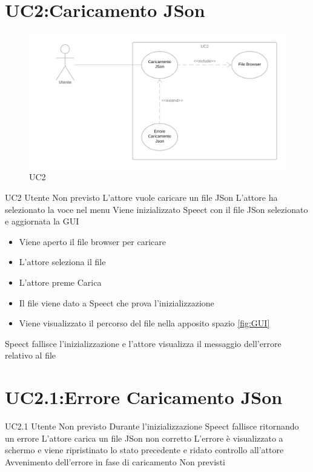 \documentclass[../AnalisideiRequisiti.tex]{subfiles}
\begin{document}
	\section{UC2:Caricamento JSon}
	\begin{figure}[H]
		\caption{UC2}
		\centering
		\includegraphics[width=\textwidth]{../img/UC02.png}
	\end{figure}
	\UserCase
	{UC2}
	{Utente}
	{Non previsto}
	{L'attore vuole caricare un file JSon}
	{L'attore ha selezionato la voce nel menu }
	{Viene inizializzato Speect con il file JSon selezionato e aggiornata la GUI}
	{
		\begin{itemize}
			\item{} Viene aperto il file browser per caricare 
			\item{} L'attore seleziona il file 
			\item{} L'attore preme Carica
			\item{} Il file viene dato a Speect che prova l'inizializzazione
			\item{} Viene visualizzato il percorso del file nella apposito spazio \ref{fig:GUI}
		\end{itemize}
	}
	{Speect fallisce l'inizializzazione e l'attore visualizza il messaggio dell'errore relativo al file }
	
	\section{UC2.1:Errore Caricamento JSon}
	\UserCase
	{UC2.1}
	{Utente}
	{Non previsto}
	{Durante l'inizializzazione Speect fallisce ritornando un errore }
	{L'attore carica un file JSon non corretto}
	{L'errore è visualizzato a schermo e viene ripristinato lo stato precedente e ridato controllo all'attore}
	{Avvenimento dell'errore in fase di caricamento}
	{Non previsti}
\end{document}

